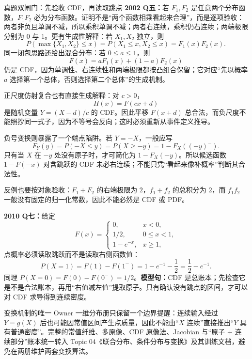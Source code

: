 \documentclass[11pt,a4paper]{ctexart}
\newenvironment{handbookdiagram}{\par\vspace{0.4em}\noindent\begin{center}}{\end{center}\vspace{0.4em}}
\newcommand{\kw}[1]{\textbf{\color{deep}#1}}
\begin{document}
\begin{handbookdiagram}
\resizebox{0.92\linewidth}{!}{%
%
}
\end{handbookdiagram}

\begin{examplebox}{真题双闸门：先验收 CDF，再读取跳点}
\textbf{2002 Q五：}若 $F_1,F_2$ 是任意两个分布函数，$F_1F_2$ 必为分布函数。证明不是“两个函数相乘看起来合理”，而是逐项验收：两者非负且单调不减，所以乘积单调不减；两者右连续，乘积仍右连续；两端极限分别为 $0$ 与 $1$。更有生成性解释：若 $X_1,X_2$ 独立，则
\[
P(\max\{X_1,X_2\}\le x)=P(X_1\le x,X_2\le x)=F_1(x)F_2(x).
\]
同一闭包思路还给出混合分布：若 $0\le a\le1$，则
\[
F(x)=aF_1(x)+(1-a)F_2(x)
\]
仍是 CDF，因为单调性、右连续性和两端极限都按凸组合保留；它对应“先以概率 $a$ 选择第一个总体，否则选择第二个总体”的生成机制。

正尺度仿射复合也有直接生成解释：对 $c>0$，
\[
H(x)=F(cx+d)
\]
是随机变量 $Y=(X-d)/c$ 的 CDF。因此平移 $F(x+d)$ 总合法，而负尺度不能照抄同一式子，因为不等号会反向；这时必须重新从事件定义推导。

负号变换则暴露了一个端点陷阱。若 $Y=-X$，一般应写
\[
F_Y(y)=P(-X\le y)=P(X\ge -y)=1-F_X((-y)^-).
\]
只有当 $X$ 在 $-y$ 处没有原子时，才可简化为 $1-F_X(-y)$。所以候选函数 $1-F(-x)$ 对含跳跃的 CDF 未必右连续；不能只凭“看起来像补概率”判断其合法性。

反例也要按对象验收：$F_1+F_2$ 的右端极限为 $2$，$f_1+f_2$ 的总积分为 $2$，而 $f_1f_2$ 一般没有固定的归一化常数，因此不能必然是 CDF 或 PDF。

\textbf{2010 Q七：}给定
\[
F(x)=\begin{cases}0,&x<0,\\[1pt]1/2,&0\le x<1,\\[1pt]1-e^{-x},&x\ge1,\end{cases}
\]
点概率必须读取跳跃而不是读取右侧函数值：
\[
P(X=1)=F(1)-F(1^-)=1-e^{-1}-\frac12=\frac12-e^{-1}.
\]
同理 $P(X=0)=F(0)-F(0^-)=1/2$。\kw{模型句：}CDF 是总账本；先检查它是不是合法账本，再用“右值减左值”提取原子。只有确认没有跳点的区间，才可以对 CDF 求导得到连续密度。
\end{examplebox}

\begin{warnbox}{变换机制的唯一 Owner}
一维分布册只保留一个边界提醒：连续输入经过 $Y=g(X)$ 后也可能因常值区间产生点质量，因此不能由“$X$ 连续”直接推出“$Y$ 具有普通密度”。完整的常值纤维、多原像、CDF 原像法、Jacobian 与“原子 + 连续部分”账本统一转入 Topic 04《联合分布、条件分布与变换》及其训练文档，避免在两册维护两套变换算法。
\end{warnbox}
\end{document}
